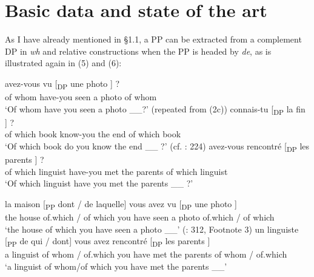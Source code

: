 \documentclass[output=paper]{langsci/langscibook}
\begin{document}
\section{Basic data and state of the art}%

As I have already mentioned in §1.1, a PP can be extracted from a complement DP in \textit{wh} and relative constructions when the PP is headed by \textit{de}, as is illustrated again in (5) and (6):

\ea%
    \label{ex:mensch:5}
    \ea
    \gll {}  avez-vous vu [\textsubscript{DP}  une  photo \soutp{[\textsubscript{PP}}{2}    \soute{qui]}] ?\\
      {}   of  whom  have-you seen {}  a  photo {}   of  whom \\
    \glt ‘Of whom have you seen a photo \_\_?’ (repeated from (2c))
    \ex  
    \gll {}  connais-tu [\textsubscript{DP}  la  fin \soutp{[\textsubscript{PP}}{2}    \soute{livre]}] ?\\
    {}     of  which  book  know-you {}  the   end {}  of which book\\
    \glt ‘Of which book do you know the end \_\_ ?’ (cf. \citealt{Sportiche1981}: 224)
    \ex  
    \gll {}   avez-vous  rencontré [\textsubscript{DP}  les parents \soutp{[\textsubscript{PP}}{2}     \soute{linguiste]}] ?\\
      {}   of which linguist  have-you  met {}  the parents {}  of which linguist\\
    \glt ‘Of which linguist have you met the parents \_\_ ?’
    \z
\z


\ea%
    \label{ex:mensch:6}
    \ea
    \gll la  maison  [\textsubscript{PP} dont / de laquelle]  vous avez  vu  [\textsubscript{DP}  une      photo \soutp{[\textsubscript{PP}}{2}    \soute{laquelle]}]\\
         the  house  {}  of.which /  of which     you have  seen {}   a      photo {}  of.which / of which\\
    \glt ‘the house of which you have seen a photo \_\_’  (\citealt{Grosu1974}: 312, Footnote 3)
    \ex  
    \gll un   linguiste [\textsubscript{PP}  de qui / dont]    vous  avez  rencontré [\textsubscript{DP}  les parents \soutp{[\textsubscript{PP}}{2}    \soute{dont]}]\\
         a  linguist {}  of whom / of.which  you  have  met {}    the     parents {}  of whom / of.which\\
    \glt ‘a linguist of whom/of which you have met the parents \_\_’  \citep[90]{Tellier1991}
    \z
\z
\end{document}
